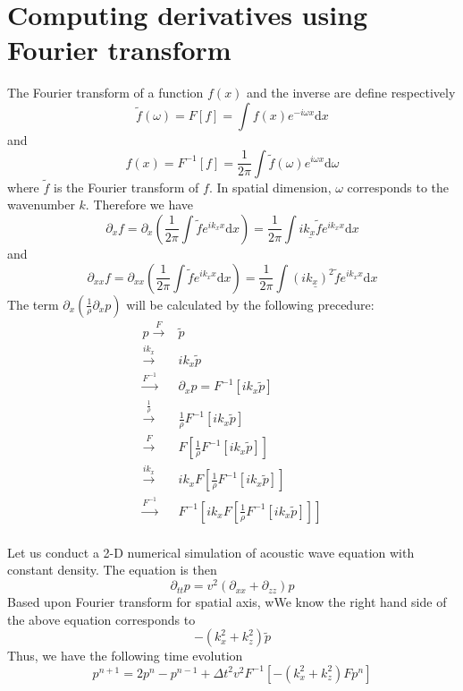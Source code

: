 \section{Computing derivatives using Fourier transform}

The Fourier transform of a function $f(x)$ and the inverse are define respectively
\begin{equation}
 \tilde{f}(\omega)=F[f]=\int f(x)e^{-i\omega x}\mathrm{d}x
\end{equation}
and 
\begin{equation}
 f(x)=F^{-1}[f]=\frac{1}{2\pi}\int \tilde{f}(\omega)e^{i\omega x}\mathrm{d}\omega
\end{equation} 
where $\tilde{f}$ is the Fourier transform of $f$. In spatial dimension, $\omega$ corresponds to the wavenumber $k$. Therefore we have
\begin{equation}
 \partial_x f=\partial_x\left( \frac{1}{2\pi}\int \tilde{f}e^{ik_x x}\mathrm{d}x\right)
= \frac{1}{2\pi}\int \underline{ik_x\tilde{f}}e^{ik_x x}\mathrm{d}x
\end{equation}
and 
\begin{equation}
 \partial_{xx} f=\partial_{xx}\left( \frac{1}{2\pi}\int \tilde{f}e^{ik_x x}\mathrm{d}x\right)
= \frac{1}{2\pi}\int \underline{(ik_x)^2\tilde{f}}e^{ik_x x}\mathrm{d}x
\end{equation}
The term $\partial_x\left(\frac{1}{\rho}\partial_x p\right)$ will be calculated by the following precedure:
\begin{equation}
\begin{array}{rl}
 p\stackrel{F}{\longrightarrow}& \tilde{p}\\
 \stackrel{ik_x}{\longrightarrow} &ik_x\tilde{p}\\
 \stackrel{F^{-1}}{\longrightarrow} &\partial_x p= F^{-1}[ik_x\tilde{p}]\\
 \stackrel{\frac{1}{\rho}}{\rightarrow} &\frac{1}{\rho}F^{-1}[ik_x\tilde{p}]\\
 \stackrel{F}{\rightarrow} & F[\frac{1}{\rho}F^{-1}[ik_x\tilde{p}]]\\
 \stackrel{ik_x}{\rightarrow} & ik_xF[\frac{1}{\rho}F^{-1}[ik_x\tilde{p}]]\\
 \stackrel{F^{-1}}{\rightarrow}& F^{-1}[ik_xF[\frac{1}{\rho}F^{-1}[ik_x\tilde{p}]]] \\
\end{array}
\end{equation}

Let us conduct a 2-D numerical simulation of acoustic wave equation with constant density. The equation is then
\begin{equation}
\partial_{tt}p=v^2 (\partial_{xx}+\partial_{zz})p
\end{equation}
Based upon Fourier transform for spatial axis, wWe know the right hand side of the above equation corresponds to 
\begin{equation}
-(k_x^2+k_z^2)\tilde{p}
\end{equation}
Thus, we have the following time evolution 
\begin{equation}
p^{n+1}=2p^n-p^{n-1}+\Delta t^2 v^2F^{-1}[-(k_x^2+k_z^2)F p^n]
\end{equation}




